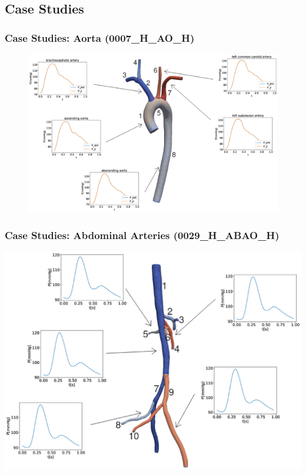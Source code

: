 \documentclass[compress]{beamer}
\begin{document}
\subsection{Case Studies}
\begin{frame}
	\frametitle{Case Studies: Aorta (0007\_H\_AO\_H)}
	\begin{figure} [H]
		\centering
		\includegraphics[width=\columnwidth]{images/0007.eps}
		\label{fig:aorta}
	\end{figure}
\end{frame}
\begin{frame}
	\frametitle{Case Studies: Abdominal Arteries (0029\_H\_ABAO\_H)}
	\includegraphics[width=\columnwidth]{images/0029.eps}
\end{frame}
\end{document}
